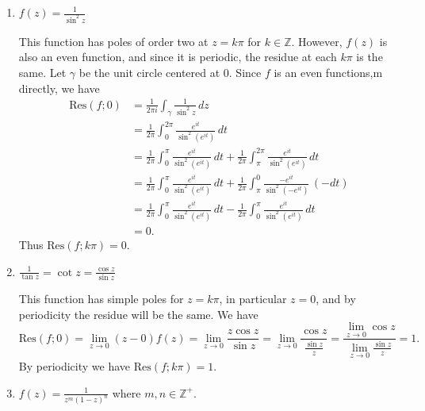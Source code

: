 \documentclass[11pt,oneside,english]{amsart}
\theoremstyle{definition}
\newcommand{\lom}[2]{\lim_{{#1}\rightarrow{#2}}}
\newcommand{\MB}[1]{\mathbb{#1}}
\newcommand{\Res}{\text{Res}}
\begin{document}
\begin{enumerate}[leftmargin=*]
\begin{enumerate}
\item $\displaystyle f(z)=\frac{1}{\sin^2z}$

This function has poles of order two at $z=k\pi$ for $k\in \MB{Z}$. However, $f(z)$ is also an even function, and since it is periodic, the residue at each $k\pi$ is the same. Let $\gamma$ be the unit circle centered at 0. Since $f$ is an even functions,m directly, we have
\begin{align*}
\Res(f;0)&=\frac{1}{2\pi i}\int_\gamma \frac{1}{\sin^2z}\,dz\\[2mm]
&=\frac{1}{2\pi}\int_0^{2\pi}\frac{e^{it}}{\sin^2(e^{it})}\,dt\\[2mm]
&=\frac{1}{2\pi}\int_0^{\pi}\frac{e^{it}}{\sin^2(e^{it})}\,dt+\frac{1}{2\pi}\int_\pi^{2\pi}\frac{e^{it}}{\sin^2(e^{it})}\,dt\\[2mm]
&=\frac{1}{2\pi}\int_0^{\pi}\frac{e^{it}}{\sin^2(e^{it})}\,dt+\frac{1}{2\pi}\int_\pi^{0}\frac{-e^{it}}{\sin^2(-e^{it})}\,(-dt)\\[2mm]
&=\frac{1}{2\pi}\int_0^{\pi}\frac{e^{it}}{\sin^2(e^{it})}\,dt-\frac{1}{2\pi}\int_0^{\pi}\frac{e^{it}}{\sin^2(e^{it})}\,dt\\[2mm]
&=0.
\end{align*}
Thus $\Res(f;k\pi)=0$.

\item $\displaystyle \frac{1}{\tan z}=\cot z=\frac{\cos z}{\sin z}$

This function has simple poles for $z=k\pi$, in particular $z=0$, and by periodicity the residue will be the same. We have
\[
\Res(f;0)=\lom{z}{0}(z-0)f(z)=\lom{z}{0}\frac{z\cos z}{\sin z}=\lom{z}{0}\frac{\cos z}{\frac{\sin z}{z}}=\frac{\lom{z}{0}\cos z}{\lom{z}{0}\frac{\sin z}{z}}=1.
\]
By periodicity we have $\Res(f;k\pi)=1$.

\item $\displaystyle f(z)= \frac{1}{z^m(1-z)^n}$ where $m,n\in \MB{Z}^+$. 


\end{enumerate}
\end{enumerate}
\end{document}
